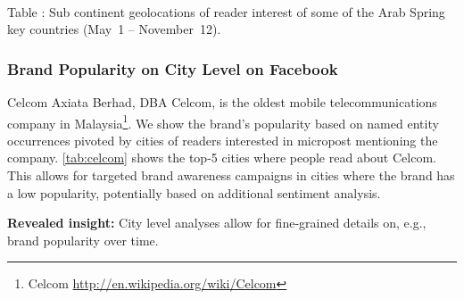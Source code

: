\documentclass{iosart2c}
\newcommand{\tablecaption}[1]{%
  \\[1em]%
  \refstepcounter{table}%
  Table \arabic{table}: #1%
}
\begin{document}
\begin{table}
  \centering
  \qquad
    \tablecaption{Sub continent geolocations of reader interest of some of the Arab Spring key countries (May~1 -- November~12).}
  \label{tab:arabspring}
\end{table}

\subsubsection{Brand Popularity on City Level on Facebook}
Celcom Axiata Berhad, DBA Celcom, is the oldest mobile telecommunications company in Malaysia\footnote{Celcom \url{http://en.wikipedia.org/wiki/Celcom}}.
We show the brand's popularity based on named entity occurrences pivoted by cities of readers interested in micropost mentioning the company.
\autoref{tab:celcom} shows the top-5 cities where people read about Celcom.
This allows for targeted brand awareness campaigns in cities where the brand has a low popularity, potentially based on additional sentiment analysis.

\textbf{Revealed insight:}
City level analyses allow for fine-grained details on, e.g., brand popularity over time.
\end{document}
